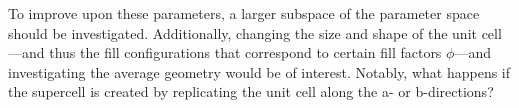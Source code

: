     To improve upon these parameters, a larger subspace of the parameter space should be investigated. Additionally, changing the size and shape of the unit cell---and thus the fill configurations that correspond to certain fill factors $\phi$---and investigating the average geometry would be of interest. Notably, what happens if the supercell is created by replicating the unit cell along the a- or b-directions? 
